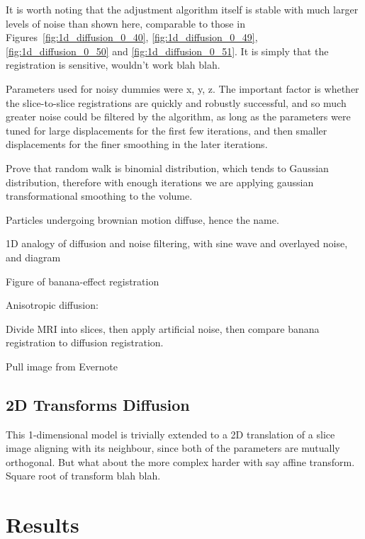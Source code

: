   It is worth noting that the adjustment algorithm itself is stable with much larger levels of noise than shown here, comparable to those in Figures~\ref{fig:1d_diffusion_0_40}, \ref{fig:1d_diffusion_0_49}, \ref{fig:1d_diffusion_0_50} and \ref{fig:1d_diffusion_0_51}. It is simply that the registration is sensitive, wouldn't work blah blah.
  
  Parameters used for noisy dummies were x, y, z. The important factor is whether the slice-to-slice registrations are quickly and robustly successful, and so much greater noise could be filtered by the algorithm, as long as the parameters were tuned for large displacements for the first few iterations, and then smaller displacements for the finer smoothing in the later iterations.
  
  Prove that random walk is binomial distribution, which tends to Gaussian distribution, therefore with enough iterations we are applying gaussian transformational smoothing to the volume.
  
  Particles undergoing brownian motion diffuse, hence the name.
  
  1D analogy of diffusion and noise filtering, with sine wave and overlayed noise, and diagram
  
  Figure of banana-effect registration
  
  Anisotropic diffusion: 
  
  Divide MRI into slices, then apply artificial noise, then compare banana registration to diffusion registration.
  
  Pull image from Evernote
  
  \subsection{2D Transforms Diffusion} %
  \label{sub:2d_transforms_diffusion}
    This 1-dimensional model is trivially extended to a 2D translation of a slice image aligning with its neighbour, since both of the parameters are mutually orthogonal. But what about the more complex harder with say affine transform. Square root of transform blah blah.
  
  

\section{Results} %
\label{sec:results}
  

